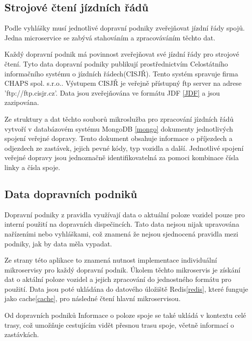 \subsection [Jízdní řády]{Strojové čtení jízdních řádů} \label{strojoveCteniJR}
Podle vyhlášky\cite{vyhlaskaJizdniRady} musí jednotlivé dopravní podniky zveřejňovat jízdní řády spojů. Jedna microservice se zabývá stahováním a zpracováváním těchto dat. \par
Každý dopravní podnik má povinnost zveřejňovat své jízdní řády pro strojové čtení. Tyto data dopravní podniky publikují prostřednictvím Celostátního informačního systému o jízdních řádech(CISJŘ)\cite{cisjr}. Tento systém spravuje firma CHAPS spol. s.r.o.\cite{chaps}. Výstupem CISJŘ je veřejně přístupný ftp server na adrese 'ftp://ftp.cisjr.cz'. Data jsou zveřejňována ve formátu JDF \ref{JDF} a jsou zazipována. \par
Ze struktury a dat těchto souborů mikroslužba pro zpracování jízdních řádů vytvoří v databázovém systému MongoDB \ref{mongo} dokumenty jednotlivých spojení veřejné dopravy. Tento dokument obsahuje informace o příjezdech a odjezdech ze zastávek, jejich pevné kódy, typ vozidla a další. Jednotlivé spojení veřejné dopravy jsou jednoznačně identifikovatelná za pomoci kombinace čísla linky a čísla spoje.
\subsection {Data dopravních podniků}
Dopravní podniky z pravidla využívají data o aktuální poloze vozidel pouze pro interní použití na dopravních dispečincích. Tato data nejsou nijak upravována nařízeními nebo vyhláškami, což znamená že nejsou sjednocená pravidla mezi podniky, jak by data měla vypadat.\par
Ze strany této aplikace to znamená nutnost implementace individuální mikroservisy pro každý dopravní podnik. Úkolem těchto mikroservis je získání dat o aktální poloze vozidel a jejich zpracování do jednostného formátu pro použití. Data jsou poté ukládána do datového úložiště Redis\ref{redis}, které funguje jako cache\ref{cache},  pro následné čtení hlavní mikroservisou.\par
Od dopravních podniků
Informace o poloze spoje se také ukládá v kontextu celé trasy, což umožňuje cestujícím vidět přesnou trasu spoje, včetně informací o zastávkách.
